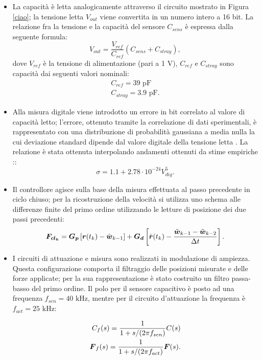 \begin{itemize}
\item La capacità è letta analogicamente attraverso il circuito mostrato in Figura \ref{ciao}; la tensione letta $V_{out}$ viene convertita in un numero intero a 16 bit. La relazione fra la tensione e la capacità del sensore $C_{sens}$ è espressa dalla seguente formula:
\begin{equation}
\label{eq:8circuito}
V_{out} = \frac{V_{ref}}{C_{ref}}\left(C_{sens}+C_{stray}\right),
\end{equation}
dove $V_{ref}$ è la tensione di alimentazione (pari a 1 V), $C_{ref}$ e $C_{stray}$ sono capacità dai seguenti valori nominali:
\begin{equation}
\label{eq:8circuito2}
\begin{array}{l}
C_{ref} = 39\text{ pF}\\
C_{stray} = 3.9 \text{ pF}.
\end{array}
\end{equation}

\item Alla misura digitale viene introdotto un errore in bit correlato al valore di capacità letto; l'errore, ottenuto tramite la correlazione di dati sperimentali, è rappresentato con una distribuzione di probabilità gaussiana a media nulla la cui deviazione standard dipende dal valore digitale della tensione letta \citep{manettiphd}. La relazione è stata ottenuta interpolando andamenti ottenuti da stime empiriche \citep{manettiphd}::
\begin{equation}
\label{eq:8circuito3}
\sigma = 1.1+2.78\cdot 10^{-24} V_{dig}^5.
\end{equation}
\item Il controllore agisce sulla base della misura effettuata al passo precedente in ciclo chiuso; per la ricostruzione della velocità si utilizza uno schema alle differenze finite del primo ordine utilizzando le letture di posizione dei due passi precedenti:
\begin{align}
\label{eq:8circuito4}
\boldsymbol{F_{cl_{k}}} = \boldsymbol{G_p}\left[\boldsymbol{r}(t_k)-\tilde{\boldsymbol{w}}_{k-1}\right]+ \boldsymbol{G_d}\left[\dot{\boldsymbol{r}}(t_k)-\frac{\tilde{\boldsymbol{w}}_{k-1}-\tilde{\boldsymbol{w}}_{k-2}}{\Delta t}\right].
\end{align}
\item I circuiti di attuazione e misura sono realizzati in modulazione di ampiezza. Questa configurazione comporta il filtraggio delle posizioni misurate e delle forze applicate; per la sua rappresentazione è stato costruito un filtro passa-basso del primo ordine. Il polo per il sensore capacitivo è posto ad una frequenza $f_{sen} = 40\text{ kHz}$, mentre per il circuito d'attuazione la frequenza è $f_{act} = 25\text{ kHz}$:

\begin{align}
\label{eq:8circuito5.0}
C_f(s) = \frac{1}{1+s/(2 \pi f_{sen})} C(s)\\
\label{eq:8circuito5.1}
\boldsymbol{F}_f(s) = \frac{1}{1+s/(2\pi f_{act})} \boldsymbol{F}(s).\\
\end{align}

\end{itemize}
